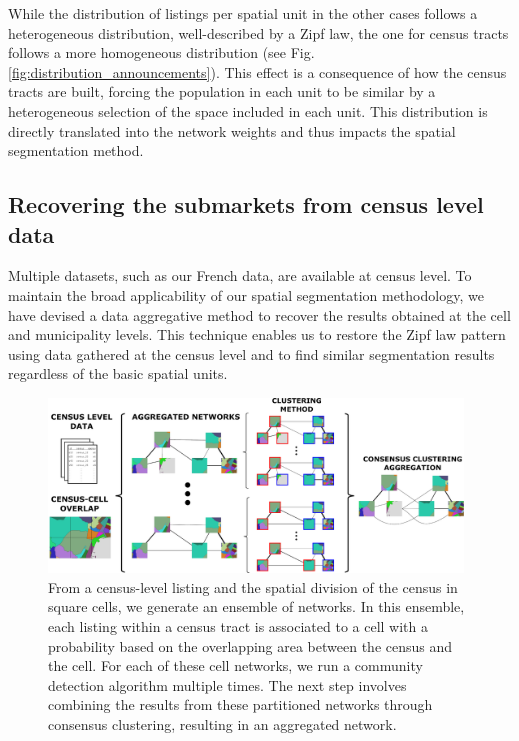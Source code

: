While the distribution of listings per spatial unit in the other cases follows a heterogeneous distribution, well-described by a Zipf law, the one for census tracts follows a more homogeneous distribution (see Fig. \ref{fig:distribution_announcements}). This effect is a consequence of how the census tracts are built, forcing the population in each unit to be similar by a heterogeneous selection of the space included in each unit. This distribution is directly translated into the network weights and thus impacts the spatial segmentation method. 

\subsection{Recovering the submarkets from census level data}\label{sec:data_agreggation}

Multiple datasets, such as our French data, are available at census level. To maintain the broad applicability of our spatial segmentation methodology, we have devised a data aggregative method to recover the results obtained at the cell and municipality levels. This technique enables us to restore the Zipf law pattern using data gathered at the census level and to find similar segmentation results regardless of the basic spatial units.

\begin{figure}
    \label{fig:stochastic_construction}
    \centering
    \includegraphics[width = 0.98\textwidth]{Figs/Idealista_segmentation/Census_cell_method.pdf}
	\caption[Stochastic aggregative method using census level data.]{ From a census-level listing and the spatial division of the census in square cells, we generate an ensemble of networks. In this ensemble, each listing within a census tract is associated to a cell with a probability based on the overlapping area between the census and the cell. For each of these cell networks, we run a community detection algorithm multiple times. The next step involves combining the results from these partitioned networks through consensus clustering, resulting in an aggregated network.}
\end{figure}

